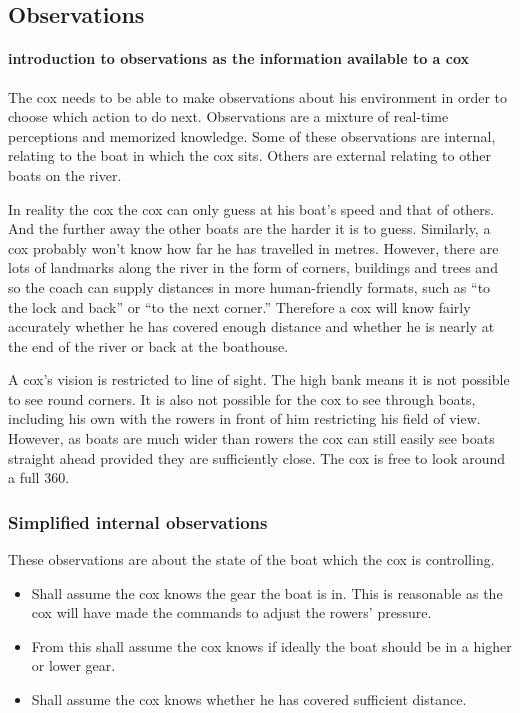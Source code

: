       \subsection{Observations} \label{model:cox:obs}
      \paragraph{introduction to observations as the information available to a cox}
      The cox needs to be able to make observations about his environment in order to choose which action to do next. Observations are a mixture of real-time perceptions and memorized knowledge. Some of these observations are internal, relating to the boat in which the cox sits. Others are external relating to other boats on the river. 
      
      In reality the cox the cox can only guess at his boat's speed and that of others. And the further away the other boats are the harder it is to guess. Similarly, a cox probably won't know how far he has travelled in metres. However, there are lots of landmarks along the river in the form of corners, buildings and trees and so the coach can supply distances in more human-friendly formats, such as ``to the lock and back'' or ``to the next corner.'' Therefore a cox will know fairly accurately whether he has covered enough distance and whether he is nearly at the end of the river or back at the boathouse.
      
      A cox's vision is restricted to line of sight. The high bank means it is not possible to see round corners. It is also not possible for the cox to see through boats, including his own with the rowers in front of him restricting his field of view. However, as boats are much wider than rowers the cox can still easily see boats straight ahead provided they are sufficiently close. The cox is free to look around a full 360\textdegree.
      
      \subsubsection{Simplified internal observations}
      These observations are about the state of the boat which the cox is controlling.
      \begin{itemize}
        \item Shall assume the cox knows the gear the boat is in. This is reasonable as the cox will have made the commands to adjust the rowers' pressure.
        \item From this shall assume the cox knows if ideally the boat should be in a higher or lower gear.
        \item Shall assume the cox knows whether he has covered sufficient distance.
      \end{itemize}
